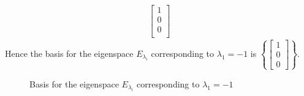 \documentclass[10pt,letterpaper,final]{report}
\begin{document}
\begin{enumerate}[label=(\alph*)]
\begin{enumerate}[label=(\arabic*)]
\begin{align*}
\begin{bmatrix}
                                                         1 \\
                                                         0 \\
                                                         0 \\
                                                       \end{bmatrix}
                \end{align*}
                Hence the basis for the eigenspace $E_{\lambda_i}$ corresponding to $\lambda_1 = -1$ is $\left\{\begin{bmatrix}1\\0\\0\end{bmatrix}\right\}$.
                \begin{figure}[H]
                  \centering
                  \caption{{Basis for the eigenspace $E_{\lambda_i}$ corresponding to $\lambda_1 = -1$}}
                \end{figure}


\end{enumerate}
\end{enumerate}
\end{document}
